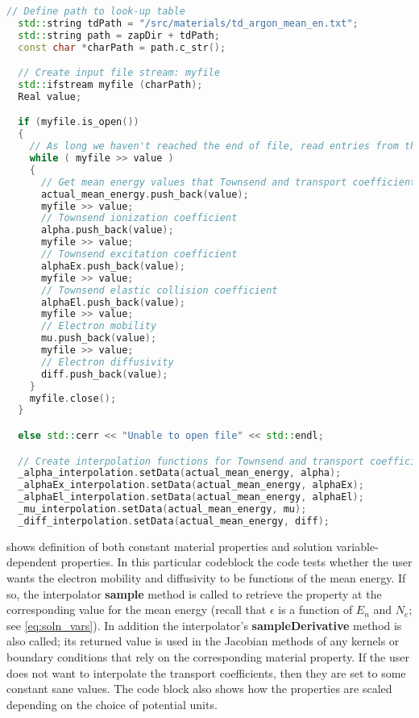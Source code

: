 \begin{lstlisting}[language=C++, caption = Code for reading in electron transport and Townsend coefficient data from a lookup table in a text file, label = code:read_in]
  // Define path to look-up table
  std::string tdPath = "/src/materials/td_argon_mean_en.txt";
  std::string path = zapDir + tdPath;
  const char *charPath = path.c_str();

  // Create input file stream: myfile
  std::ifstream myfile (charPath);
  Real value;

  if (myfile.is_open())
  {
    // As long we haven't reached the end of file, read entries from the look-up table into respective data arrays
    while ( myfile >> value )
    {
      // Get mean energy values that Townsend and transport coefficients are a function of
      actual_mean_energy.push_back(value);
      myfile >> value;
      // Townsend ionization coefficient
      alpha.push_back(value);
      myfile >> value;
      // Townsend excitation coefficient
      alphaEx.push_back(value);
      myfile >> value;
      // Townsend elastic collision coefficient
      alphaEl.push_back(value);
      myfile >> value;
      // Electron mobility
      mu.push_back(value);
      myfile >> value;
      // Electron diffusivity
      diff.push_back(value);
    }
    myfile.close();
  }

  else std::cerr << "Unable to open file" << std::endl;

  // Create interpolation functions for Townsend and transport coefficients that depend on the mean energy
  _alpha_interpolation.setData(actual_mean_energy, alpha);
  _alphaEx_interpolation.setData(actual_mean_energy, alphaEx);
  _alphaEl_interpolation.setData(actual_mean_energy, alphaEl);
  _mu_interpolation.setData(actual_mean_energy, mu);
  _diff_interpolation.setData(actual_mean_energy, diff);
\end{lstlisting}

 shows definition of both constant material properties and solution variable-dependent properties. In this particular codeblock the code tests whether the user wants the electron mobility and diffusivity to be functions of the mean energy. If so, the interpolator \textbf{sample} method is called to retrieve the property at the corresponding value for the mean energy (recall that $\epsilon$ is a function of $E_n$ and $N_e$; see \cref{eq:soln_vars}). In addition the interpolator's \textbf{sampleDerivative} method is also called; its returned value is used in the Jacobian methods of any kernels or boundary conditions that rely on the corresponding material property. If the user does not want to interpolate the transport coefficients, then they are set to some constant sane values. The code block also shows how the properties are scaled depending on the choice of potential units.

